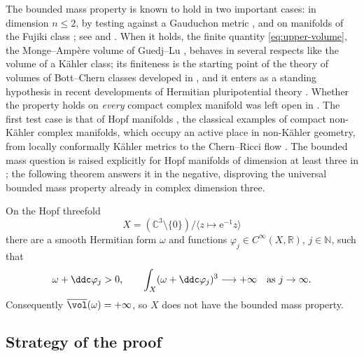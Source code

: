 \documentclass[11pt,a4paper]{article}
\begin{document}
	The bounded mass property is known to hold in two important cases: in
	dimension $n\le2$, by testing against a Gauduchon metric
	\cite{Gau77}, and on manifolds of the Fujiki class
	\cite{Fuj78,Var89}; see \cite{GL22} and \cite[\S1.5]{BGL}.  When it
	holds, the finite quantity \eqref{eq:upper-volume}, the
	Monge--Amp\`ere volume of Guedj--Lu \cite{GL22}, behaves in several
	respects like the volume of a K\"ahler class; its finiteness is the starting
	point of the theory of volumes of Bott--Chern classes developed in
	\cite{BGL}, and it enters as a standing hypothesis in recent
	developments of Hermitian pluripotential theory \cite{ALS25,LiX26}.
	Whether the property holds on \emph{every} compact complex manifold
	was left open in \cite{BGL}.  The first test case is that of Hopf
	manifolds \cite{Hopf48}, the classical examples of compact
	non-K\"ahler complex manifolds, which occupy an active place in
	non-K\"ahler geometry, from locally conformally K\"ahler metrics
	\cite{OV24} to the Chern--Ricci flow \cite{TW15}.
	The bounded mass question is raised explicitly for Hopf manifolds of
	dimension at least three in \cite[Example 1.19]{BGL}; the following
	theorem answers it in the negative, disproving the universal bounded
	mass property already in complex dimension three.
	
	\begin{theorem}\label{thm:main}
		On the Hopf threefold
		\[
		X=(\mathbb C^3\setminus\{0\})/\langle z\mapsto \mathrm{e}^{-1}z\rangle
		\]
		there are a smooth Hermitian form $\omega$ and functions
		$\varphi_j\in C^\infty(X,\mathbb R)$, $j\in\mathbb N$, such that
		\[
		\omega+\ddc\varphi_j>0,
		\qquad
		\int_X(\omega+\ddc\varphi_j)^3\longrightarrow+\infty
		\quad\text{as }j\to\infty.
		\]
		Consequently $\overline{\vol}(\omega)=+\infty$, so $X$ does not have the
		bounded mass property.
	\end{theorem}
	
	\subsection*{Strategy of the proof}
	
\end{document}
